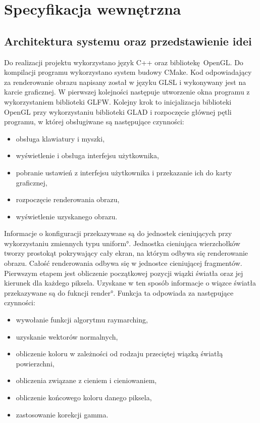 \chapter{Specyfikacja wewnętrzna}
\label{ch:05}

\section{Architektura systemu oraz przedstawienie idei}
Do realizacji projektu wykorzystano język C++ oraz bibliotekę OpenGL. Do kompilacji programu wykorzystano system budowy CMake. Kod odpowiadający za renderowanie obrazu napisany został w języku GLSL i wykonywany jest na karcie graficznej.
W pierwszej kolejności następuje utworzenie okna programu z wykorzystaniem biblioteki GLFW. Kolejny krok to inicjalizacja biblioteki OpenGL przy wykorzystaniu biblioteki GLAD i rozpoczęcie głównej pętli programu, w której obsługiwane są następujące czynności:
\begin{itemize}
\item obsługa klawiatury i myszki,
\item wyświetlenie i obsługa interfejsu użytkownika,
\item pobranie ustawień z interfejsu użytkownika i przekazanie ich do karty graficznej,
\item rozpoczęcie renderowania obrazu,
\item wyświetlenie uzyskanego obrazu.
\end{itemize}

Informacje o konfiguracji przekazywane są do jednostek cieniujących przy wykorzystaniu zmiennych typu \ang{uniform}. Jednostka cieniująca wierzchołków tworzy prostokąt pokrywający cały ekran, na którym odbywa się renderowanie obrazu. Całość renderowania odbywa się w jednostce cieniującej fragmentów. Pierwszym etapem jest obliczenie początkowej pozycji wiązki światła oraz jej kierunek dla każdego piksela. Uzyskane w ten sposób informacje o wiązce światła przekazywane są do fukncji \ang{render}. Funkcja ta odpowiada za następujące czynności:
\begin{itemize}
\item wywołanie funkcji algorytmu raymarching,
\item uzyskanie wektorów normalnych,
\item obliczenie koloru w zależności od rodzaju przeciętej wiązką światłą powierzchni,
\item obliczenia związane z cieniem i cieniowaniem,
\item obliczenie końcowego koloru danego piksela,
\item zastosowanie korekcji gamma.
\end{itemize}

